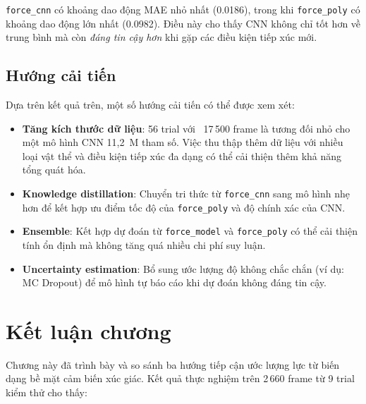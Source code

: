 \texttt{force\_cnn} có khoảng dao động MAE nhỏ nhất (0.0186), trong khi
\texttt{force\_poly} có khoảng dao động lớn nhất (0.0982). Điều này cho thấy
CNN không chỉ tốt hơn về trung bình mà còn \emph{đáng tin cậy hơn} khi gặp
các điều kiện tiếp xúc mới.

\subsection{Hướng cải tiến}

Dựa trên kết quả trên, một số hướng cải tiến có thể được xem xét:

\begin{itemize}
  \item \textbf{Tăng kích thước dữ liệu}: 56 trial với ~17\,500 frame là
        tương đối nhỏ cho một mô hình CNN 11,2~M tham số. Việc thu thập thêm
        dữ liệu với nhiều loại vật thể và điều kiện tiếp xúc đa dạng có thể
        cải thiện thêm khả năng tổng quát hóa.

  \item \textbf{Knowledge distillation}: Chuyển tri thức từ \texttt{force\_cnn}
        sang mô hình nhẹ hơn để kết hợp ưu điểm tốc độ của
        \texttt{force\_poly} và độ chính xác của CNN.

  \item \textbf{Ensemble}: Kết hợp dự đoán từ \texttt{force\_model} và
        \texttt{force\_poly} có thể cải thiện tính ổn định mà không tăng quá
        nhiều chi phí suy luận.

  \item \textbf{Uncertainty estimation}: Bổ sung ước lượng độ không chắc
        chắn (ví dụ: MC Dropout) để mô hình tự báo cáo khi dự đoán không
        đáng tin cậy.
\end{itemize}

\section{Kết luận chương}
\label{sec:chapter_conclusion}

Chương này đã trình bày và so sánh ba hướng tiếp cận ước lượng lực từ biến
dạng bề mặt cảm biến xúc giác. Kết quả thực nghiệm trên 2\,660 frame từ 9
trial kiểm thử cho thấy:

